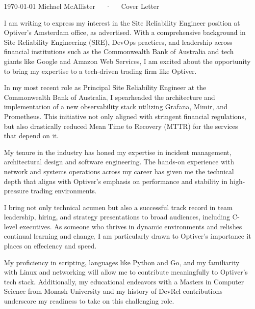 \documentclass[11pt, a4paper]{awesome-cv}
\begin{document}
\makecvheader[R]

\makecvfooter
  {\today}
  {Michael McAllister~~~·~~~Cover Letter}
  {}

\makelettertitle

\begin{cvletter}
I am writing to express my interest in the Site Reliability Engineer position at Optiver’s Amsterdam office, as advertised. With a comprehensive background in Site Reliability Engineering (SRE), DevOps practices, and leadership across financial institutions such as the Commonwealth Bank of Australia and tech giants like Google and Amazon Web Services, I am excited about the opportunity to bring my expertise to a tech-driven trading firm like Optiver.

In my most recent role as Principal Site Reliability Engineer at the Commonwealth Bank of Australia, I spearheaded the architecture and implementation of a new observability stack utilizing Grafana, Mimir, and Prometheus. This initiative not only aligned with stringent financial regulations, but also drastically reduced Mean Time to Recovery (MTTR) for the services that depend on it.

My tenure in the industry has honed my expertise in incident management, architectural design and software engineering. The hands-on experience with network and systems operations across my career has given me the technical depth that aligns with Optiver's emphasis on performance and stability in high-pressure trading environments.

I bring not only technical acumen but also a successful track record in team leadership, hiring, and strategy presentations to broad audiences, including C-level executives. As someone who thrives in dynamic environments and relishes continual learning and change, I am particularly drawn to Optiver's importance it places on effeciency and speed.

My proficiency in scripting, languages like Python and Go, and my familiarity with Linux and networking will allow me to contribute meaningfully to Optiver's tech stack. Additionally, my educational endeavors with a Masters in Computer Science from Monash University and my history of DevRel contributions underscore my readiness to take on this challenging role.


\end{cvletter}
\end{document}
